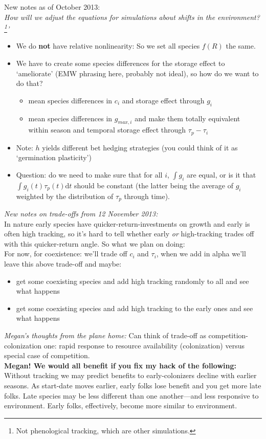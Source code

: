 \documentclass[11pt,a4paper,oneside]{article}
\begin{document}
\noindent New notes as of October 2013:\\
\emph{How will we adjust the equations for simulations about shifts in the environment?\footnote{Not phenological tracking, which are other simulations.}'}
\begin{itemize}
\item We do {\bf not} have relative nonlinearity: So we set all species \(f(R)\) the same. 
\item We have to create some species differences for the storage effect to `ameliorate' (EMW phrasing here, probably not ideal), so how do we want to do that?
\begin{itemize}
\item mean species differences in \(c_{i}\) and storage effect through \(g_{i}\) 
\item mean species differences in \(g_{max,i}\) and make them totally equivalent within season and temporal storage effect through \(\tau_{p}-\tau_{i}\) 
\end{itemize}
\item Note: \(h\) yields different bet hedging strategies (you could think of it as `germination plasticity')
\item Question: do we need to make sure that for all \(i\), \(\int g_{i}\) are equal, or is it that \(\int g_{i}(t)\tau_{p}(t)\mathrm{d}t\) should be constant (the latter being the average of \(g_{i}\) weighted by the distribution of \(\tau_{p}\) through time).
\end{itemize}

\noindent \emph{New notes on trade-offs from 12 November 2013:}\\
In nature early species have quicker-return-investments on growth and early is often high tracking, so it's hard to tell whether early \emph{or} high-tracking trades off with this quicker-return angle. So what we plan on doing:\\

\noindent For now, for coexistence: we'll trade off \(c_{i}\) and \(\tau_{i}\), when we add in alpha we'll leave this above trade-off and maybe:
\begin{itemize}
\item get some coexisting species and add high tracking randomly to all and see what happens
\item get some coexisting species and add high tracking to the early ones and see what happens
\end{itemize}

\noindent \emph{Megan's thoughts from the plane home:} Can think of trade-off as competition-colonization one: rapid response to resource availability (colonization) versus special case of competition.\\
{\bf Megan! We would all benefit if you fix my hack of the following:} Without tracking we may predict benefits to early-colonizers decline with earlier seasons. As start-date moves earlier, early folks lose benefit and you get more late folks. Late species may be less different than one another---and less responsive to environment. Early folks, effectively, become more similar to environment. 
\end{document}

